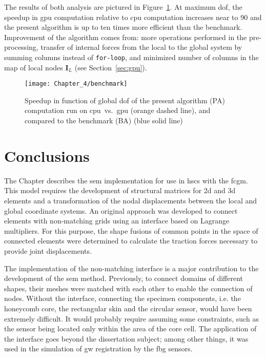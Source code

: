 \documentclass[11pt,a4paper,final]{report}
\theoremstyle{plain}
\begin{document}
The results of both analysis are pictured in Figure~\ref{fig:speedup}.
At maximum \ac{dof}, the speedup in \ac{gpu} computation relative to \ac{cpu} computation increases near to 90 and the present algorithm is up to ten times more efficient than the benchmark.
Improvement of the algorithm comes from: more operations performed in the pre-processing, transfer of internal forces from the local to the global system by summing columns instead of \verb+for-loop+, and minimized number of columns in the map of local nodes $\textbf{I}_L$ (see Section~\ref{sec:gpu}).
\begin{figure}[!tbh]
	\begin{center}
		\texttt{[image: Chapter\_4/benchmark]}
	\end{center}
	\caption{Speedup in function of global \acf{dof} of the present algorithm (PA) computation run on \acf{cpu}~vs.~\acf{gpu} (orange dashed line), and compared to the benchmark (BA) (blue solid line)}
	\label{fig:speedup}
\end{figure} \section{Conclusions}
\label{sec:conclusionsSEM}
The Chapter describes the \ac{sem} implementation for use in \acp{hsc} with the \ac{fcgm}.
This model requires the development of structural matrices for \ac{2d} and \ac{3d} elements and a transformation of the nodal displacements between the local and global coordinate systems.
An original approach was developed to connect elements with non-matching grids using an interface based on Lagrange multipliers.
For this purpose, the shape fusions of common points in the space of connected elements were determined to calculate the traction forces necessary to provide joint displacements.

The implementation of the non-matching interface is a major contribution to the development of the \ac{sem} method.
Previously, to connect domains of different shapes, their meshes were matched with each other to enable the connection of nodes.
Without the interface, connecting the specimen components, i.e. the honeycomb core, the rectangular skin and the circular sensor, would have been extremely difficult.
It would probably require assuming some constraints, such as the sensor being located only within the area of the core cell.
The application of the interface goes beyond the dissertation subject; among other things, it was used in the simulation of \ac{gw} registration by the \ac{fbg} sensors.
\end{document}
